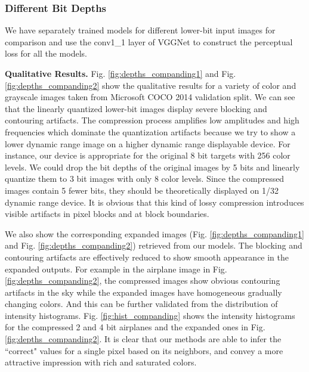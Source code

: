 \documentclass[journal]{IEEEtran}
\begin{document}
\subsubsection{Different Bit Depths}

We have separately trained models for different lower-bit input images for comparison and use the conv1\_1 layer of VGGNet to construct the perceptual loss for all the models.

\textbf{Qualitative Results.}
Fig. \ref{fig:depths_companding1} and Fig. \ref{fig:depths_companding2} show the qualitative results for a variety of color and grayscale images taken from Microsoft COCO 2014 validation split. We can see that the linearly quantized lower-bit images display severe blocking and contouring artifacts. The compression process amplifies low amplitudes and high frequencies which dominate the quantization artifacts because we try to show a lower dynamic range image on a higher dynamic range displayable device. For instance, our device is appropriate for the original 8 bit targets with 256 color levels. We could drop the bit depths of the original images by 5 bits and linearly quantize them to 3 bit images with only 8 color levels. Since the compressed images contain 5 fewer bits, they should be theoretically displayed on 1/32 dynamic range device. It is obvious that this kind of lossy compression introduces visible artifacts in pixel blocks and at block boundaries.

We also show the corresponding expanded images (Fig. \ref{fig:depths_companding1} and Fig. \ref{fig:depths_companding2}) retrieved from our models. The blocking and contouring artifacts are effectively reduced to show smooth appearance in the expanded outputs. For example in the airplane image in Fig. \ref{fig:depths_companding2}, the compressed images show obvious contouring artifacts in the sky while the expanded images have homogeneous gradually changing colors. And this can be further validated from the distribution of intensity histograms. Fig. \ref{fig:hist_companding} shows the intensity histograms for the compressed 2 and 4 bit airplanes and the expanded ones in Fig. \ref{fig:depths_companding2}. It is clear that our methods are able to infer the ``correct" values for a single pixel based on its neighbors, and convey a more attractive impression with rich and saturated colors.


\end{document}

